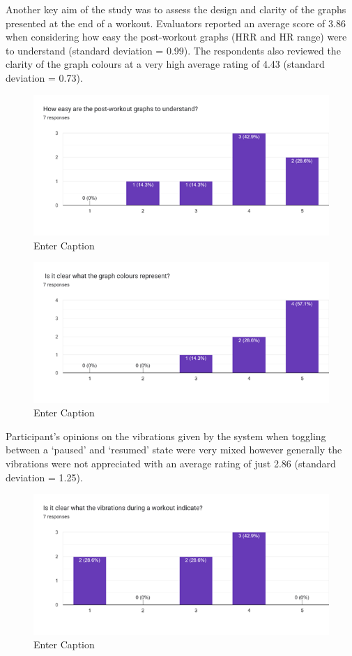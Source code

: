 \documentclass{l4proj}
\begin{document}
Another key aim of the study was to assess the design and clarity of the graphs presented at the end of a workout. Evaluators reported an average score of 3.86 when considering how easy the post-workout graphs (HRR and HR range) were to understand (standard deviation = 0.99). The respondents also reviewed the clarity of the graph colours at a very high average rating of 4.43 (standard deviation = 0.73).

\begin{figure}[h!]
    \centering
    \includegraphics[width=0.75\linewidth]{dissertation//dissImages/GraphEasy.png}
    \caption{Enter Caption}
    \label{fig:enter-label}
\end{figure}

\begin{figure}[h!]
    \centering
    \includegraphics[width=0.75\linewidth]{dissertation//dissImages/GraphColour.png}
    \caption{Enter Caption}
    \label{fig:enter-label}
\end{figure}

Participant’s opinions on the vibrations given by the system when toggling between a ‘paused’ and ‘resumed’ state were very mixed however generally the vibrations were not appreciated with an average rating of just 2.86 (standard deviation = 1.25).

\begin{figure}[h!]
    \centering
    \includegraphics[width=0.75\linewidth]{dissertation//dissImages/Vibrations.png}
    \caption{Enter Caption}
    \label{fig:enter-label}
\end{figure}
\end{document}
